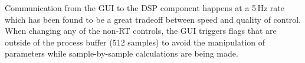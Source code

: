 \documentclass[twoside,a4paper]{article}
\begin{document}
Communication from the GUI to the DSP component happens at a 5\,Hz rate which has been found to be a great tradeoff between speed and quality of control. When changing any of the non-RT controls, the GUI triggers flags that are outside of the process buffer (512 samples) to avoid the manipulation of parameters while sample-by-sample calculations are being made. 

\begin{figure}[t!]
    \centering
     \hfill
     \hfill
     \hfill

\end{figure}
\end{document}
